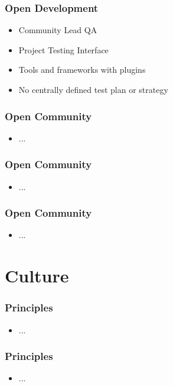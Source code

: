 \documentclass[aspectratio=169,11pt,hyperref={colorlinks=true}]{beamer}
\begin{document}
\begin{frame}
  \frametitle{Open Development}
    \begin{itemize}
        \item{Community Lead QA}
        \item{Project Testing Interface}
        \item{Tools and frameworks with plugins}
        \item{No centrally defined test plan or strategy}
    \end{itemize}
\end{frame}

\begin{frame}
  \frametitle{Open Community}
    \begin{itemize}
        \item{...}
    \end{itemize}
\end{frame}

\begin{frame}
  \frametitle{Open Community}
    \begin{itemize}
        \item{...}
    \end{itemize}
\end{frame}

\begin{frame}
  \frametitle{Open Community}
    \begin{itemize}
        \item{...}
    \end{itemize}
\end{frame}

\section{Culture}

\begin{frame}
  \frametitle{Principles}
    \begin{itemize}
        \item{...}
    \end{itemize}
\end{frame}

\begin{frame}
  \frametitle{Principles}
    \begin{itemize}
        \item{...}
    \end{itemize}
\end{frame}
\end{document}
